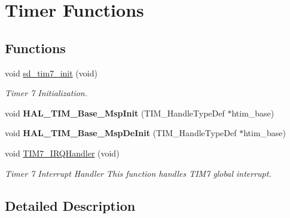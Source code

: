 \hypertarget{group___s_d___t_i_m___functions}{}\section{Timer Functions}
\label{group___s_d___t_i_m___functions}
\subsection*{Functions}
\begin{DoxyCompactItemize}
\item 
\mbox{\label{group___s_d___t_i_m___functions_ga795a5beb3ac4ee7060a142b4f1ce4a5d}} 
void \mbox{\hyperlink{group___s_d___t_i_m___functions_ga795a5beb3ac4ee7060a142b4f1ce4a5d}{sd\+\_\+tim7\+\_\+init}} (void)
\begin{DoxyCompactList}\small\item\em Timer 7 Initialization. \end{DoxyCompactList}\item 
\mbox{\label{group___s_d___t_i_m___functions_gabb25ade2f7e3f7aae167bd52270c2b86}} 
void {\bfseries H\+A\+L\+\_\+\+T\+I\+M\+\_\+\+Base\+\_\+\+Msp\+Init} (T\+I\+M\+\_\+\+Handle\+Type\+Def $\ast$htim\+\_\+base)
\item 
\mbox{\label{group___s_d___t_i_m___functions_ga555b8a2d3c7a07341f8cb1255318fa2b}} 
void {\bfseries H\+A\+L\+\_\+\+T\+I\+M\+\_\+\+Base\+\_\+\+Msp\+De\+Init} (T\+I\+M\+\_\+\+Handle\+Type\+Def $\ast$htim\+\_\+base)
\item 
\mbox{\label{group___s_d___t_i_m___functions_ga98cff83252098363b2dbca9608df964e}} 
void \mbox{\hyperlink{group___s_d___t_i_m___functions_ga98cff83252098363b2dbca9608df964e}{T\+I\+M7\+\_\+\+I\+R\+Q\+Handler}} (void)
\begin{DoxyCompactList}\small\item\em Timer 7 Interrupt Handler This function handles T\+I\+M7 global interrupt. \end{DoxyCompactList}\end{DoxyCompactItemize}


\subsection{Detailed Description}
